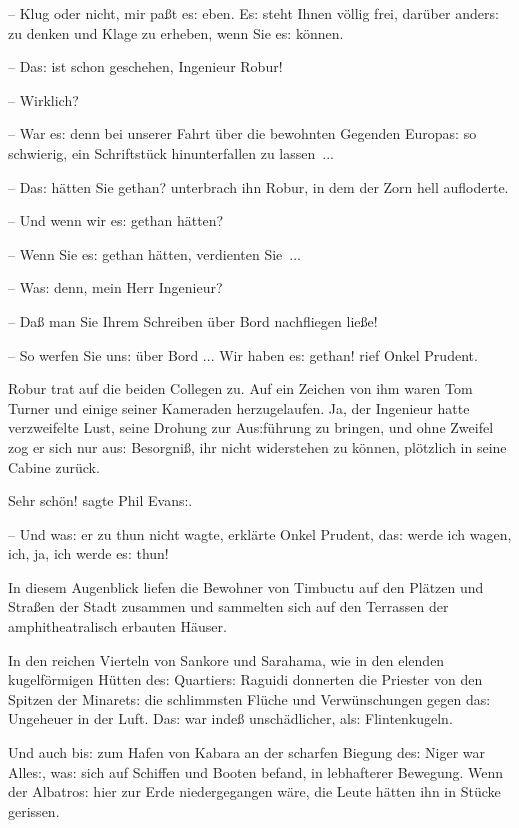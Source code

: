 \documentclass[oneside,12pt]{book}
\newcommand{\s}{s:}
\begin{document}
-- Klug oder nicht, mir pa{\ss}t e{\s} eben. E{\s} steht Ihnen
v\"ollig frei, dar\"uber ander{\s} zu denken und Klage zu erheben,
wenn Sie e{\s} k\"onnen.

-- Da{\s} ist schon geschehen, Ingenieur Robur!

-- Wirklich?

-- War e{\s} denn bei unserer Fahrt \"uber die bewohnten Gegenden
Europa{\s} so schwierig, ein Schriftst\"uck hinunterfallen zu
lassen~...

-- Da{\s} h\"atten Sie gethan? unterbrach ihn Robur, in dem der Zorn
hell aufloderte.

-- Und wenn wir e{\s} gethan h\"atten?

-- Wenn Sie e{\s} gethan h\"atten, verdienten Sie~...

-- Wa{\s} denn, mein Herr Ingenieur?

-- Da{\ss} man Sie Ihrem Schreiben \"uber Bord nachfliegen lie{\ss}e!

-- So werfen Sie un{\s} \"uber Bord ... Wir haben e{\s}
gethan!{\grqq} rief Onkel Prudent.

Robur trat auf die beiden Collegen zu. Auf ein Zeichen von ihm waren
Tom Turner und einige seiner Kameraden herzugelaufen. Ja, der
Ingenieur hatte verzweifelte Lust, seine Drohung zur Au{\s}f\"uhrung
zu bringen, und ohne Zweifel zog er sich nur au{\s} Besorgni{\ss},
ihr nicht widerstehen zu k\"onnen, pl\"otzlich in seine Cabine
zur\"uck.

{\glqq}Sehr sch\"on! sagte Phil Evan{\s}.

-- Und wa{\s} er zu thun nicht wagte, erkl\"arte Onkel Prudent,
da{\s} werde ich wagen, ich, ja, ich werde e{\s} thun!{\grqq}

In diesem Augenblick liefen die Bewohner von Timbuctu auf den
Pl\"atzen und Stra{\ss}en der Stadt zusammen und sammelten sich auf
den Terrassen der amphitheatralisch erbauten H\"auser.

In den reichen Vierteln von Sankore und Sarahama, wie in den elenden
kugelf\"ormigen H\"utten de{\s} Quartier{\s} Raguidi donnerten die
Priester von den Spitzen der Minaret{\s} die schlimmsten Fl\"uche und
Verw\"unschungen gegen da{\s} Ungeheuer in der Luft. Da{\s} war
inde{\ss} unsch\"adlicher, al{\s} Flintenkugeln.

Und auch bi{\s} zum Hafen von Kabara an der scharfen Biegung de{\s}
Niger war Alle{\s}, wa{\s} sich auf Schiffen und Booten befand, in
lebhafterer Bewegung. Wenn der {\glqq}Albatro{\s}{\grqq} hier zur
Erde niedergegangen w\"are, die Leute h\"atten ihn in St\"ucke
gerissen.
\end{document}
